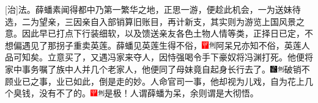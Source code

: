 {{[}治{]}法。}薛蟠素闻得都中乃第一繁华之地，正思一游，便趁此机会，一为送妹待选，二为望亲，三因亲自入部销算旧账目，再计新支，其实则为游览上国风景之意。因此早已打点下行装细软，以及馈送亲友各色土物人情等类，正择日已定，不想偏遇见了那拐子重卖英莲。薛蟠见英莲生得不俗，{\includegraphics[width=3mm]{../Images/00002}\includegraphics[width=3mm]{../Images/00011}\footnotesize \kaishu 阿呆兄亦知不俗，英莲人品可知矣。}立意买了，又遇冯家来夺人，因恃强喝令手下豪奴将冯渊打死。他便将家中事务嘱了族中人并几个老家人，他便同了母妹竟自起身长行去了。{\includegraphics[width=3mm]{../Images/00006}\includegraphics[width=3mm]{../Images/00011}\footnotesize \kaishu 破销不顾业已之事，业已如此，倒是走的妙。}人命官司一事，他却视为儿戏，自为花上几个臭钱，没有不了的。{\includegraphics[width=3mm]{../Images/00002}\includegraphics[width=3mm]{../Images/00011}\footnotesize \kaishu 是极！人谓薛蟠为呆，余则谓是大彻悟。}

